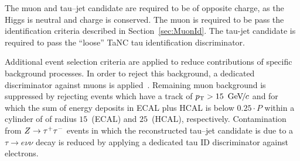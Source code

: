 The muon and tau--jet candidate are required to be of opposite charge, as the
Higgs is neutral and charge is conserved.  The muon is required to be pass the
identification criteria described in Section~\ref{sec:MuonId}.   The tau-jet
candidate is required to pass the ``loose'' TaNC tau identification
discriminator. 

Additional event selection criteria are applied to reduce contributions of
specific background processes. In order to reject this background, a dedicated
discriminator against muons is applied~\cite{CMS-PAS-PFT-08-001}. Remaining muon
background is suppressed by rejecting events which have a track of $p_{\mathrm{T}} >
15~{\,\text{Ge\hspace{-.08em}V\hspace{-0.16em}/\hspace{-0.08em}}c}$ and for which the sum of energy deposits in ECAL plus HCAL is below
$0.25 \cdot P$ within a cylinder of of radius $15$~\centi\meter (ECAL) and
$25$~\centi\meter (HCAL), respectively.  
Contamination from $Z \to \tau^+\tau^-$ events in which the
reconstructed tau--jet candidate is due to a $\tau \to e \nu \nu$ decay is
reduced by applying a dedicated tau ID discriminator against electrons.

